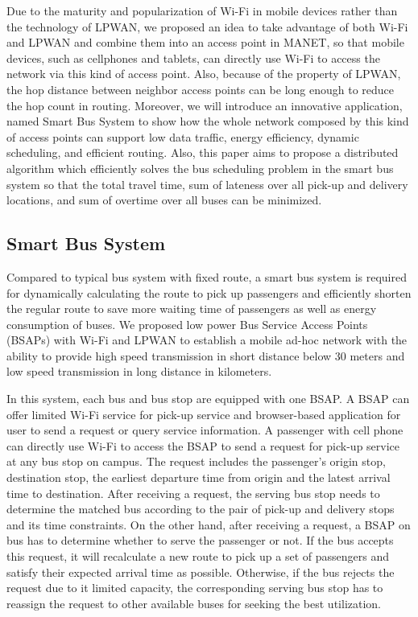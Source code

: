 \documentclass[runningheads]{llncs}
\begin{document}
Due to the maturity and popularization of Wi-Fi in mobile devices rather than the technology of LPWAN, we proposed an idea to take advantage of both Wi-Fi and LPWAN and combine them into an access point in MANET, so that mobile devices, such as cellphones and tablets, can directly use Wi-Fi to access the network via this kind of access point. Also, because of the property of LPWAN, the hop distance between neighbor access points can be long enough to reduce the hop count in routing. Moreover, we will introduce an innovative application, named Smart Bus System to show how the whole network composed by this kind of access points can support low data traffic, energy efficiency, dynamic scheduling, and efficient routing. Also, this paper aims to propose a distributed algorithm which efficiently solves the bus scheduling problem in the smart bus system so that the total travel time, sum of lateness over all pick-up and delivery locations, and sum of overtime over all buses can be minimized.

\subsection{Smart Bus System}
Compared to typical bus system with fixed route, a smart bus system is required for dynamically calculating the route to pick up passengers and efficiently shorten the regular route to save more waiting time of passengers as well as energy consumption of buses. We proposed low power Bus Service Access Points (BSAPs) with Wi-Fi and LPWAN to establish a mobile ad-hoc network with the ability to provide high speed transmission in short distance below 30 meters and low speed transmission in long distance in kilometers.

In this system, each bus and bus stop are equipped with one BSAP. A BSAP can offer limited Wi-Fi service for pick-up service and browser-based application for user to send a request or query service information. A passenger with cell phone can directly use Wi-Fi to access the BSAP to send a request for pick-up service at any bus stop on campus. The request includes the passenger’s origin stop, destination stop, the earliest departure time from origin and the latest arrival time to destination. After receiving a request, the serving bus stop needs to determine the matched bus according to the pair of pick-up and delivery stops and its time constraints. On the other hand, after receiving a request, a BSAP on bus has to determine whether to serve the passenger or not. If the bus accepts this request, it will recalculate a new route to pick up a set of passengers and satisfy their expected arrival time as possible. Otherwise, if the bus rejects the request due to it limited capacity, the corresponding serving bus stop has to reassign the request to other available buses for seeking the best utilization.
\end{document}
